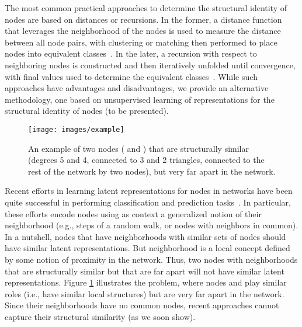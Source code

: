 \documentclass[sigconf]{acmart}
\begin{document}
The most common practical approaches to determine the structural identity of nodes are based on distances or recursions. In the former, a distance function that leverages the neighborhood of the nodes is used to measure the distance between all node pairs, with clustering or matching then performed to place nodes into equivalent classes~\cite{Leicht2006,Fouss2007}. In the later, a recursion with respect to neighboring nodes is constructed and then iteratively unfolded until convergence, with final values used to determine the equivalent classes~\cite{Kleinberg1999,Blondel2004,Zager2008}. While such approaches have advantages and disadvantages, we provide an alternative methodology, one based on unsupervised learning of representations for the structural identity of nodes (to be presented).
\begin{figure}[t]
\texttt{[image: images/example]}
\caption{An example of two nodes ( and ) that are structurally similar (degrees 5 and 4, connected to 3 and 2 triangles, connected to the rest of the network by two nodes), but very far apart in the network.}
\label{fig:example}
\end{figure}
Recent efforts in learning latent representations for nodes in networks have been quite successful in performing classification and prediction tasks~\cite{node2vec-kdd2016,subgraph2vec,Perozzi2014,line}. In particular, these efforts encode nodes using as context a generalized notion of their neighborhood (e.g.,  steps of a random walk, or nodes with neighbors in common). In a nutshell, nodes that have neighborhoods with similar sets of nodes should have similar latent representations. But neighborhood is a local concept defined by some notion of proximity in the network. Thus, two nodes with neighborhoods that are structurally similar but that are far apart will not have similar latent representations. Figure \ref{fig:example} illustrates the problem, where nodes  and  play similar roles (i.e., have similar local structures) but are very far apart in the network. Since their neighborhoods have no common nodes, recent approaches cannot capture their structural similarity (as we soon show).
\end{document}

